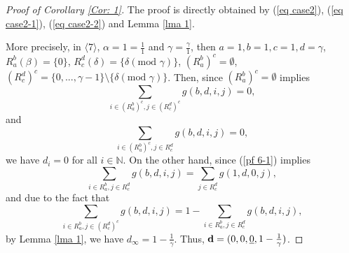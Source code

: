 \documentclass{amsart}
\theoremstyle{definition}
\numberwithin{equation}{section}%
\begin{document}
     
\begin{proof}[Proof of Corollary \ref{Cor: 1}]
    The proof is directly obtained by (\ref{eq case2}), (\ref{eq case2-1}), (\ref{eq case2-2}) and Lemma \ref{lma 1}. 
    
    More precisely, in $\langle 7\rangle$, $\alpha=1=\frac{1}{1}$ and $\gamma=\frac{\gamma}{1}$, then $a=1, b=1, c=1, d=\gamma$, $R_a^b(\beta)=\{0\}$, $R_c^d(\delta)=\{ \delta (\mbox{mod } \gamma) \}$, $(R_a^b)^c=\emptyset$, $(R_c^d)^c=\{0, ..., \gamma-1\}\setminus\{ \delta (\mbox{mod } \gamma) \}$. Then, since $(R_a^b)^c=\emptyset$ implies 
    \begin{equation*}
        \sum_{i\in (R_a^b)^c, j\in (R_c^d)^c}g(b,d,i,j)=0,
    \end{equation*}
    and
    \begin{equation}\label{pf 6-1}
   \sum_{i\in (R_a^b)^c, j\in R_c^d}g(b,d,i,j)=0,     
    \end{equation}
    we have $d_i=0$ for all $i\in \mathbb{N}$. On the other hand, since (\ref{pf 6-1}) implies 
    \begin{equation*}
       \sum_{i\in R_a^b, j\in R_c^d}g(b,d,i,j)=\sum_{ j\in R_c^d}g(1,d,0,j) ,
    \end{equation*}
    and due to the fact that
    \begin{equation*}
        \sum_{i\in R_a^b, j\in (R_c^d)^c}g(b,d,i,j)=1-\sum_{i\in R_a^b, j\in R_c^d}g(b,d,i,j),
    \end{equation*}
    by Lemma \ref{lma 1}, we have $d_\infty=1-\frac{1}{\gamma}$. Thus, ${\bf d}=(0, 0, \underline{0}, 1-\frac{1}{\gamma}) $. 
    

\end{proof}
\end{document}
